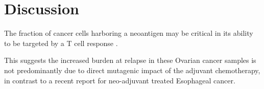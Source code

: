 \section*{Discussion}

The fraction of cancer cells harboring a neoantigen may be critical in its ability to be targeted by a T cell response \cite{McGranahan_2016}.

 This suggests the increased burden at relapse in these Ovarian cancer samples is not predominantly due to direct mutagenic impact of the adjuvant chemotherapy, in contrast to a recent report for neo-adjuvant treated Esophageal cancer.